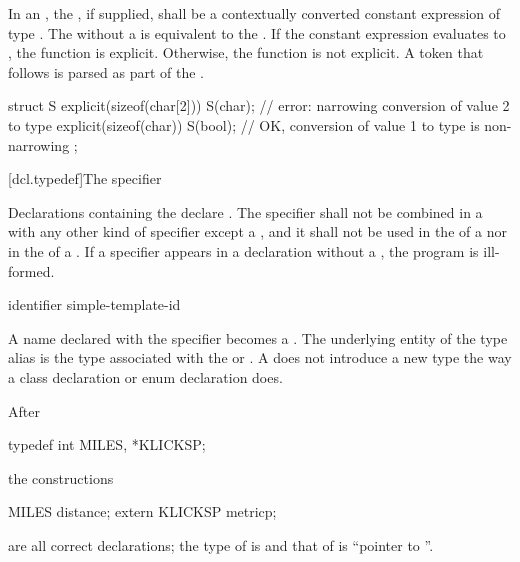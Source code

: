 \pnum
In an ,
the , if supplied, shall be a
contextually converted constant expression of type .
The  
without a  is equivalent to
the  .
If the constant expression evaluates to ,
the function is explicit. Otherwise, the function is not explicit.
A \tcode{(} token that follows  is parsed as
part of the .
\begin{example}
\begin{codeblock}
struct S {
  explicit(sizeof(char[2])) S(char);    // error: narrowing conversion of value 2 to type 
  explicit(sizeof(char)) S(bool);       // OK, conversion of value 1 to type  is non-narrowing
};
\end{codeblock}
\end{example}

[dcl.typedef]{The  specifier}%

%
%
\pnum
Declarations containing the  
declare .
The  specifier shall not be
combined in a  with any other kind of
specifier except a , and it shall not be used in the
 of a
 nor in the
 of a
.
If a  specifier appears in a declaration without a ,
the program is ill-formed.

\begin{bnf}
\br
    identifier\br
    simple-template-id
\end{bnf}

A name declared with the  specifier becomes a
.
The underlying entity of the type alias is
the type associated with the 
or .
%
A  does not introduce a new type the way a class
declaration or enum declaration does.
\begin{example}
After
\begin{codeblock}
typedef int MILES, *KLICKSP;
\end{codeblock}
the constructions
\begin{codeblock}
MILES distance;
extern KLICKSP metricp;
\end{codeblock}
are all correct declarations; the type of  is
 and that of  is ``pointer to ''.
\end{example}

